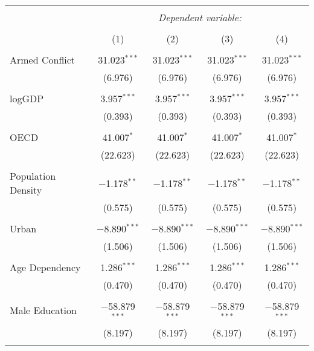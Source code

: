 
\begin{table}[!htbp] \centering 
  \caption{} 
  \label{} 
\begin{tabular}{@{\extracolsep{5pt}}lcccc} 
\\[-1.8ex]\hline 
\hline \\[-1.8ex] 
 & \multicolumn{4}{c}{\textit{Dependent variable:}} \\ 
\cline{2-5} 
\\[-1.8ex] & (1) & (2) & (3) & (4)\\ 
\hline \\[-1.8ex] 
 Armed Conflict & 31.023$^{***}$ & 31.023$^{***}$ & 31.023$^{***}$ & 31.023$^{***}$ \\ 
  & (6.976) & (6.976) & (6.976) & (6.976) \\ 
  & & & & \\ 
 logGDP & 3.957$^{***}$ & 3.957$^{***}$ & 3.957$^{***}$ & 3.957$^{***}$ \\ 
  & (0.393) & (0.393) & (0.393) & (0.393) \\ 
  & & & & \\ 
 OECD & 41.007$^{*}$ & 41.007$^{*}$ & 41.007$^{*}$ & 41.007$^{*}$ \\ 
  & (22.623) & (22.623) & (22.623) & (22.623) \\ 
  & & & & \\ 
 Population Density & $-$1.178$^{**}$ & $-$1.178$^{**}$ & $-$1.178$^{**}$ & $-$1.178$^{**}$ \\ 
  & (0.575) & (0.575) & (0.575) & (0.575) \\ 
  & & & & \\ 
 Urban & $-$8.890$^{***}$ & $-$8.890$^{***}$ & $-$8.890$^{***}$ & $-$8.890$^{***}$ \\ 
  & (1.506) & (1.506) & (1.506) & (1.506) \\ 
  & & & & \\ 
 Age Dependency & 1.286$^{***}$ & 1.286$^{***}$ & 1.286$^{***}$ & 1.286$^{***}$ \\ 
  & (0.470) & (0.470) & (0.470) & (0.470) \\ 
  & & & & \\ 
 Male Education & $-$58.879$^{***}$ & $-$58.879$^{***}$ & $-$58.879$^{***}$ & $-$58.879$^{***}$ \\ 
  & (8.197) & (8.197) & (8.197) & (8.197) \\ 
  & & & & \\ 

\end{tabular}
\end{table}
